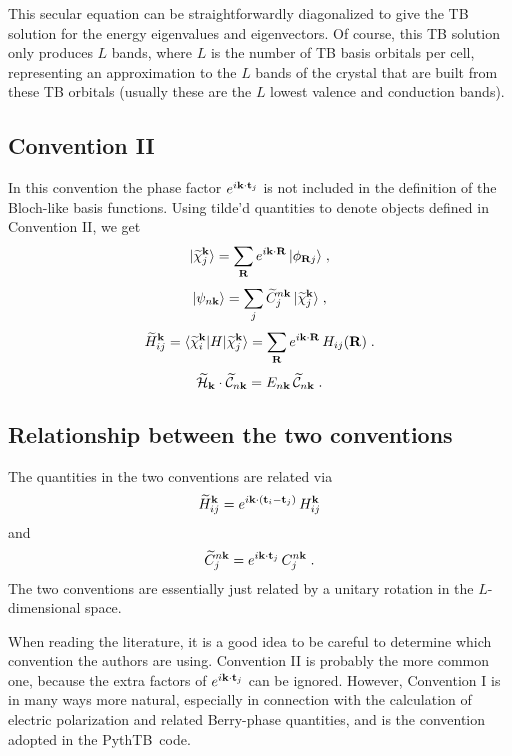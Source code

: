 \documentclass[11pt]{article}
\numberwithin{equation}{section} %
\def\beq{\begin{equation}}
\def\eeq{\end{equation}}
\def\PythTB{{\sc PythTB}}
\def\ket#1{\vert #1 \rangle}
\def\bra#1{\langle #1 \vert}
\def\me#1#2#3{\bra{#1}#2\ket{#3}}
\def\k{{\bf k}}
\def\R{{\bf R}}
\def\t{{\bf t}}
\def\t{{\bf t}}
\def\Ct{{\widetilde{C}}}
\def\chit{{\widetilde{\chi}}}
\def\Ht{{\widetilde{H}}}
\def\cHt{{\widetilde{\cal H}}}
\def\cCt{{\widetilde{\cal C}}}
\begin{document}
This secular equation can be straightforwardly diagonalized to
give the TB solution for the energy eigenvalues and eigenvectors.
Of course, this TB solution only produces $L$ bands, where $L$ is
the number of TB basis orbitals per cell, representing an approximation
to the $L$ bands of the crystal that are built from these TB
orbitals (usually these are the $L$ lowest valence and
conduction bands).

\subsection{Convention II}

In this convention the phase factor $e^{i\k\cdot\t_j}$ is not
included in the definition of the Bloch-like basis functions.  Using
tilde'd quantities to denote objects defined in Convention II, we
get
%
\beq
\ket{\chit^\k_j}=\sum_\R e^{i\k\cdot\R}\,\ket{\phi_{\R j}} \;,
\eeq
%
\beq
\ket{\psi_{n\k}} = \sum_j \Ct_j^{n\k} \, \ket{\chit^\k_j} \;,
\eeq
%
\beq
\Ht_{ij}^\k = \me{\chit_i^\k}{H}{\chit_j^\k}
=\sum_\R e^{i\k\cdot\R}\,H_{ij}(\R) \;.
\eeq
%
\beq
\cHt_\k\cdot \cCt_{n\k} = E_{n\k}\,\cCt_{n\k} \;.
\eeq

\subsection{Relationship between the two conventions}
\label{sec:rel}

The quantities in the two conventions are related via
%
\beq
\Ht_{ij}^\k=e^{i\k\cdot(\t_i-\t_j)}\,H_{ij}^\k
\eeq
%
and
\beq
\Ct_j^{n\k}=e^{i\k\cdot\t_j}\,C_j^{n\k} \;.
\eeq
%
The two conventions are essentially just related by a unitary
rotation in the $L$-dimensional space.

When reading the literature, it is a good idea to be careful to
determine which convention the authors are using.  Convention II
is probably the more common one, because the extra factors of
$e^{i\k\cdot\t_j}$ can be ignored.  However, Convention I is in
many ways more natural, especially in connection with the calculation
of electric polarization and related Berry-phase quantities, and
is the convention adopted in the \PythTB\ code.
\end{document}
